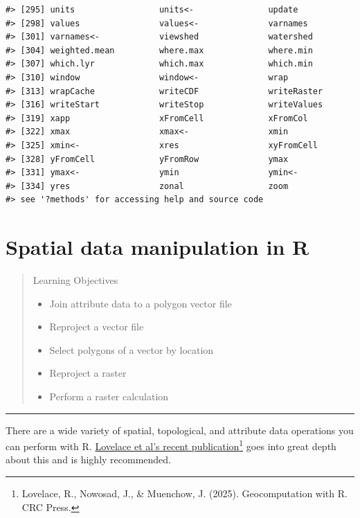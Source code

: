 \documentclass[
]{book}
\providecommand{\tightlist}{%
  \setlength{\itemsep}{0pt}\setlength{\parskip}{0pt}}
\begin{document}
\begin{verbatim}
#> [295] units                 units<-               update               
#> [298] values                values<-              varnames             
#> [301] varnames<-            viewshed              watershed            
#> [304] weighted.mean         where.max             where.min            
#> [307] which.lyr             which.max             which.min            
#> [310] window                window<-              wrap                 
#> [313] wrapCache             writeCDF              writeRaster          
#> [316] writeStart            writeStop             writeValues          
#> [319] xapp                  xFromCell             xFromCol             
#> [322] xmax                  xmax<-                xmin                 
#> [325] xmin<-                xres                  xyFromCell           
#> [328] yFromCell             yFromRow              ymax                 
#> [331] ymax<-                ymin                  ymin<-               
#> [334] yres                  zonal                 zoom                 
#> see '?methods' for accessing help and source code
\end{verbatim}

\chapter{Spatial data manipulation in R}\label{spatialops}

\begin{quote}
Learning Objectives

\begin{itemize}
\tightlist
\item
  Join attribute data to a polygon vector file
\item
  Reproject a vector file
\item
  Select polygons of a vector by location
\item
  Reproject a raster
\item
  Perform a raster calculation
\end{itemize}
\end{quote}

\begin{center}\rule{0.5\linewidth}{0.5pt}\end{center}

There are a wide variety of spatial, topological, and attribute data operations you can perform with R. \href{https://r.geocompx.org/}{Lovelace et al's recent publication}\footnote{Lovelace, R., Nowosad, J., \& Muenchow, J. (2025). Geocomputation with R. CRC Press.} goes into great depth about this and is highly recommended.
\end{document}
